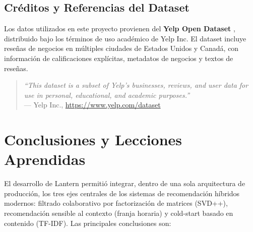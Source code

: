 \documentclass[11pt,a4paper]{article}
\begin{document}
\subsection{Créditos y Referencias del Dataset}

Los datos utilizados en este proyecto provienen del \textbf{Yelp Open Dataset} \cite{yelp2024}, distribuido bajo los términos de uso académico de Yelp Inc. El dataset incluye reseñas de negocios en múltiples ciudades de Estados Unidos y Canadá, con información de calificaciones explícitas, metadatos de negocios y textos de reseñas.

\begin{quote}
\small
\textit{``This dataset is a subset of Yelp's businesses, reviews, and user data for use in personal, educational, and academic purposes.''}  \\
— Yelp Inc., \url{https://www.yelp.com/dataset}
\end{quote}


\section{Conclusiones y Lecciones Aprendidas}

El desarrollo de Lantern permitió integrar, dentro de una sola arquitectura de producción, los tres ejes centrales de los sistemas de recomendación híbridos modernos: filtrado colaborativo por factorización de matrices (SVD++), recomendación sensible al contexto (franja horaria) y cold-start basado en contenido (TF-IDF). Las principales conclusiones son:
\end{document}
